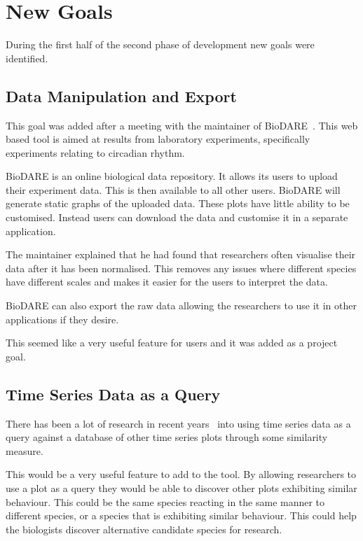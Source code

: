 \section{New Goals}
During the first half of the second phase of development new goals were identified.

\subsection{Data Manipulation and Export}

This goal was added after a meeting with the maintainer of BioDARE~\cite{biodare}.  This web based tool is aimed at results from laboratory experiments, specifically experiments relating to circadian rhythm.

BioDARE is an online biological data repository.  It allows its users to upload their experiment data.  This is then available to all other users.  BioDARE will generate static graphs of the uploaded data.  These plots have little ability to be customised.  Instead users can download the data and customise it in a separate application.

The maintainer explained that he had found that researchers often visualise their data after it has been normalised.  This removes any issues where different species have different scales and makes it easier for the users to interpret the data.

BioDARE can also export the raw data allowing the researchers to use it in other applications if they desire.

This seemed like a very useful feature for users and it was added as a project goal.

\subsection{Time Series Data as a Query}

There has been a lot of research in recent years~\cite{goldin, chakrabarti, popivanov, faloutsos2, bollobas} into using time series data as a query against a database of other time series plots through some similarity measure.

This would be a very useful feature to add to the tool.  By allowing researchers to use a plot as a query they would be able to discover other plots exhibiting similar behaviour.  This could be the same species reacting in the same manner to different species, or a species that is exhibiting similar behaviour.  This could help the biologists discover alternative candidate species for research.

